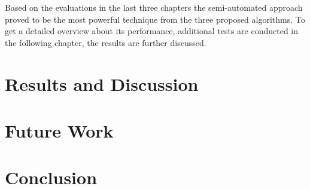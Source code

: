 \documentclass[draft,final]{vutinfth} %
\begin{document}
\par
Based on the evaluations in the last three chapters the semi-automated approach proved to be the most powerful technique from the three proposed algorithms.
To get a detailed overview about its performance, additional tests are conducted in the following chapter, the results are further discussed.

\chapter{Results and Discussion}

\chapter{Future Work}

\chapter{Conclusion}


\backmatter


\cleardoublepage %






\end{document}
